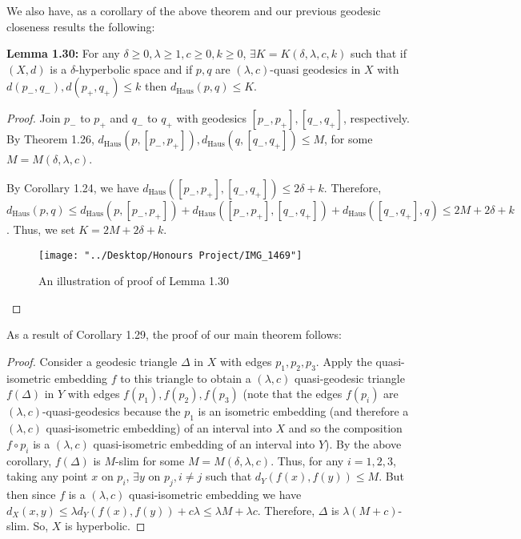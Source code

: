 \documentclass[12pt]{article}
\newcommand{\vs}{\vskip10pt}
\begin{document}
	We also have, as a corollary of the above theorem and our previous geodesic closeness results the following: 
	
	\vs 
	
	\textbf{Lemma 1.30: } For any $\delta \geq 0, \lambda \geq 1, c \geq 0, k \geq 0$, $\exists K = K(\delta, \lambda, c, k)$ such that if $(X,d)$ is a $\delta$-hyperbolic space and if $p,q$ are $(\lambda, c)$-quasi geodesics in $X$ with $d(p_-, q_-), d(p_+, q_+) \leq k$ then $d_{\text{Haus}}(p,q) \leq K$. 
	
	\begin{proof}
		
		Join $p_-$ to $p_+$ and $q_-$ to $q_+$ with geodesics $[p_-, p_+], [q_-, q_+]$, respectively. By Theorem 1.26, $d_{\text{Haus}}(p, [p_-, p_+]), d_{\text{Haus}}(q, [q_-, q_+]) \leq M$, for some $M = M(\delta, \lambda, c)$.
		
		\vs
		 By Corollary 1.24, we have $d_{\text{Haus}}([p_-, p_+], [q_-, q_+]) \leq 2\delta + k$. Therefore, $d_{\text{Haus}}(p,q) \leq d_{\text{Haus}}(p, [p_-, p_+]) + d_{\text{Haus}}([p_-, p_+], [q_-, q_+]) + d_{\text{Haus}}([q_-, q_+], q) \leq 2M + 2\delta + k$. Thus, we set $K = 2M + 2\delta + k$.
		
		\begin{figure} [H]
			\centering
			\texttt{[image: "../Desktop/Honours Project/IMG\_1469"]}
			\caption{An illustration of proof of Lemma 1.30}
			\label{fig:img1469}
		\end{figure}
		
	\end{proof}

	As a result of Corollary 1.29, the proof of our main theorem follows: 
	
	\begin{proof}
		
		Consider a geodesic triangle $\Delta$ in $X$ with edges $p_1, p_2, p_3$. Apply the quasi-isometric embedding $f$ to this triangle to obtain a $(\lambda, c)$ quasi-geodesic triangle $f(\Delta)$ in $Y$ with edges $f(p_1), f(p_2), f(p_3)$ (note that the edges $f(p_i)$ are $(\lambda, c)$-quasi-geodesics because the $p_1$ is an isometric embedding (and therefore a $(\lambda, c)$ quasi-isometric embedding) of an interval into $X$ and so the composition $f \circ p_i$ is a $(\lambda, c)$ quasi-isometric embedding of an interval into $Y$). By the above corollary, $f(\Delta)$ is $M$-slim for some $M = M(\delta, \lambda, c)$. Thus, for any $i = 1,2,3$, taking any point $x$ on $p_i$, $\exists y$ on $p_j, i \neq j$ such that $d_Y(f(x), f(y)) \leq M$. But then since $f$ is a $(\lambda, c)$ quasi-isometric embedding we have $d_X(x,y) \leq \lambda d_Y(f(x), f(y)) + c \lambda \leq \lambda M + \lambda c$. Therefore, $\Delta$ is $\lambda (M + c)$-slim. So, $X$ is hyperbolic. 
		
	\end{proof}
\end{document}
